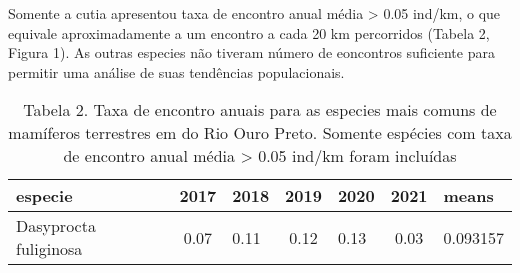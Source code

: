 \documentclass[]{tufte-handout}
\begin{document}
Somente a cutia apresentou taxa de encontro anual média \textgreater{}
0.05 ind/km, o que equivale aproximadamente a um encontro a cada 20 km
percorridos (Tabela 2, Figura 1). As outras especies não tiveram número
de eoncontros suficiente para permitir uma análise de suas tendências
populacionais.

\begin{table}

\caption{\label{tab:unnamed-chunk-4}Tabela 2. Taxa de encontro anuais para as especies mais comuns de mamíferos terrestres em do Rio Ouro Preto. Somente espécies com taxa de encontro anual média > 0.05 ind/km foram incluídas}
\centering
\begin{tabular}[t]{lclclcl}
\toprule
especie & 2017 & 2018 & 2019 & 2020 & 2021 & means\\
\midrule
Dasyprocta fuliginosa & 0.07 & 0.11 & 0.12 & 0.13 & 0.03 & 0.093157\\
\bottomrule
\end{tabular}
\end{table}
\end{document}
